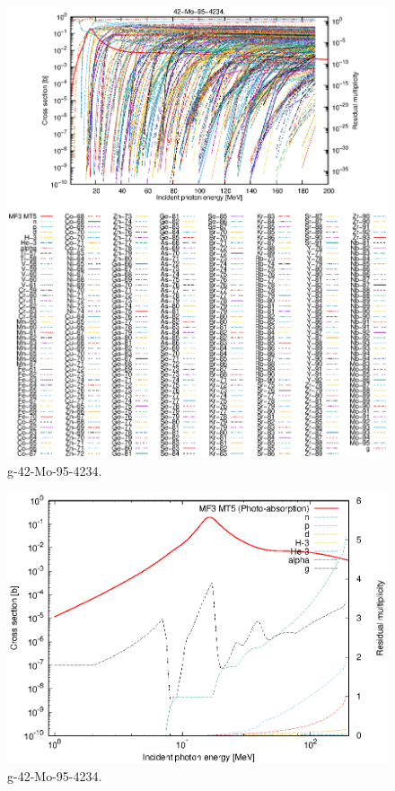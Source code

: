 \begin{figure}
 \includegraphics[width=\linewidth]{eps/g_42-Mo-95_4234.eps}
  \caption{g-42-Mo-95-4234.}
\end{figure}
\newpage \clearpage

\begin{figure}
 \includegraphics[width=\linewidth]{eps-log/g_42-Mo-95_4234.eps}
 \caption{g-42-Mo-95-4234.}
\end{figure}
\newpage \clearpage

